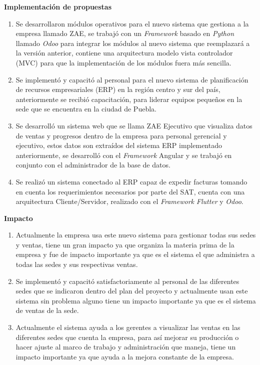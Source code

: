 \documentclass[protocolo.tex]{subfiles}
\begin{document}
\textbf{Implementación de propuestas}
\begin{enumerate}
\item Se desarrollaron módulos operativos para el nuevo sistema que gestiona a la empresa llamado ZAE, se
trabajó con un \textit{Framework} basado en \textit{Python} llamado \textit{Odoo} para integrar los módulos al
nuevo sistema que reemplazará a la versión anterior, contiene una arquitectura modelo vista controlador (MVC) para
que la implementación de los módulos fuera más sencilla.


\item Se implementó y capacitó al personal para el nuevo sistema de planificación de recursos empresariales (ERP) en la región centro y
sur del país, anteriormente se recibió capacitación, para liderar equipos pequeños en la sede
que se encuentra en la ciudad de Puebla.


\item Se desarrolló un sistema web que se llama ZAE Ejecutivo que visualiza datos de ventas y progresos dentro de la
empresa para personal gerencial y ejecutivo, estos datos son extraídos del sistema ERP
implementado anteriormente, se desarrolló con el \textit{Framework} Angular y se trabajó en
conjunto con el administrador de la base de datos.

\item Se realizó un sistema conectado al ERP capaz de expedir facturas tomando en cuenta
los requerimientos necesarios por parte del SAT, cuenta con una arquitectura
Cliente/Servidor, realizado con el \textit{Framework} \textit{Flutter} y \textit{Odoo}.


\end{enumerate}

\textbf{Impacto}
\begin{enumerate}
\item Actualmente la empresa usa este nuevo sistema para gestionar todas sus sedes y ventas,
tiene un gran impacto ya que organiza la materia prima de la empresa y fue de impacto
importante ya que es el sistema el que administra a todas las sedes y sus respectivas
ventas.

\item Se implementó y capacitó satisfactoriamente al personal de las diferentes sedes que se
indicaron dentro del plan del proyecto y actualmente usan este sistema sin problema alguno
tiene un impacto importante ya que es el sistema de ventas de la sede.

\item Actualmente el sistema ayuda a los gerentes a visualizar las ventas en las diferentes
sedes que cuenta la empresa, para así mejorar su producción o hacer ajuste al marco de
trabajo y administración que maneja, tiene un impacto importante ya que ayuda a la mejora
constante de la empresa.



\end{enumerate}
\end{document}
